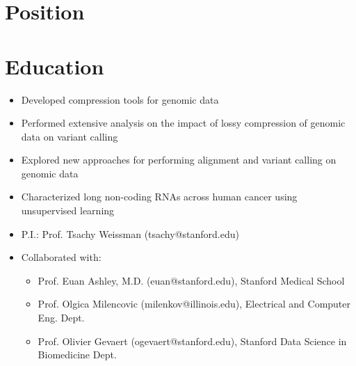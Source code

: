 \documentclass[11pt,a4paper,sans]{moderncv}        %
\begin{document}
\makecvtitle
\vspace{-25pt}
\vspace{-5pt}

\section{Position}

\section{Education}




\begin{itemize}
 \item Developed compression tools for genomic data
 \item Performed extensive analysis on the impact of lossy compression of genomic data on variant calling
 \item Explored new approaches for performing alignment and variant calling on genomic data
 \item Characterized long non-coding RNAs across human cancer using unsupervised learning
  \item P.I.: Prof. Tsachy Weissman (tsachy@stanford.edu)
  \item Collaborated with: 
  \begin{itemize}
  \item Prof. Euan Ashley, M.D. (euan@stanford.edu), Stanford Medical School
  \item Prof. Olgica Milencovic (milenkov@illinois.edu), Electrical and Computer Eng. Dept.
  \item Prof. Olivier Gevaert (ogevaert@stanford.edu), Stanford Data Science in Biomedicine Dept.
  \end{itemize}
\end{itemize}
\end{document}
